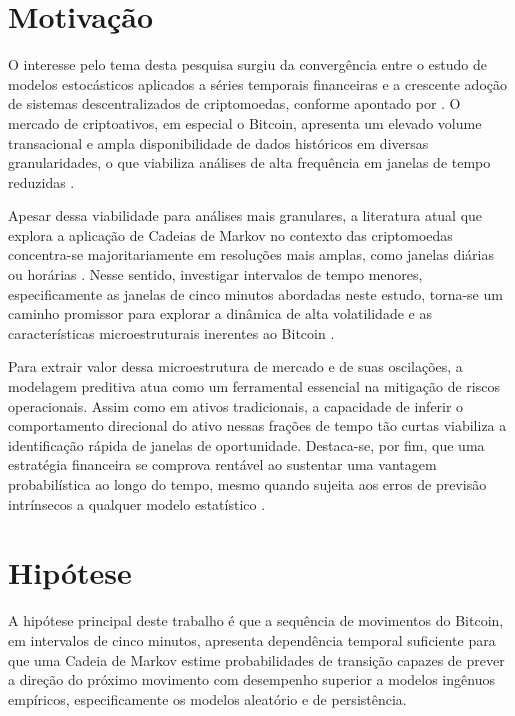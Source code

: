 \documentclass[
    12pt,                %
    openright,           %
    oneside,             %
    a4paper,             %
    english,             %
    brazil               %
]{abntex2}
\begin{document}
\section{Motivação}

O interesse pelo tema desta pesquisa surgiu da convergência entre o estudo de modelos estocásticos aplicados a séries temporais financeiras e a crescente adoção de sistemas descentralizados de criptomoedas, conforme apontado por . O mercado de criptoativos, em especial o Bitcoin, apresenta um elevado volume transacional e ampla disponibilidade de dados históricos em diversas granularidades, o que viabiliza análises de alta frequência em janelas de tempo reduzidas \cite{catania2019bitcoin}.

Apesar dessa viabilidade para análises mais granulares, a literatura atual que explora a aplicação de Cadeias de Markov no contexto das criptomoedas concentra-se majoritariamente em resoluções mais amplas, como janelas diárias \cite{NASCIMENTO} ou horárias \cite{ARAUJO}. Nesse sentido, investigar intervalos de tempo menores, especificamente as janelas de cinco minutos abordadas neste estudo, torna-se um caminho promissor para explorar a dinâmica de alta volatilidade e as características microestruturais inerentes ao Bitcoin \cite{catania2019bitcoin}.

Para extrair valor dessa microestrutura de mercado e de suas oscilações, a modelagem preditiva atua como um ferramental essencial na mitigação de riscos operacionais. Assim como em ativos tradicionais, a capacidade de inferir o comportamento direcional do ativo nessas frações de tempo tão curtas viabiliza a identificação rápida de janelas de oportunidade. Destaca-se, por fim, que uma estratégia financeira se comprova rentável ao sustentar uma vantagem probabilística ao longo do tempo, mesmo quando sujeita aos erros de previsão intrínsecos a qualquer modelo estatístico \cite{Silva2021}.

\section{Hipótese}

A hipótese principal deste trabalho é que a sequência de movimentos do Bitcoin,
em intervalos de cinco minutos, apresenta dependência temporal suficiente para que uma
Cadeia de Markov estime probabilidades de transição capazes de prever a direção
do próximo movimento com desempenho superior a modelos ingênuos empíricos, 
especificamente os modelos aleatório e de persistência.
\end{document}

